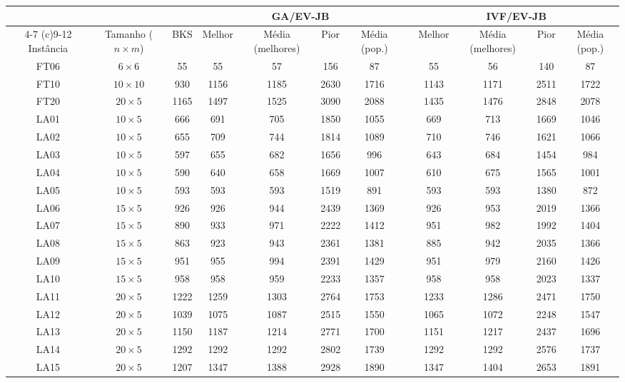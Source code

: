 \begin{sidewaystable}
\caption{Resultados do caso de experimento 4}
\centering
\label{experimento4}
\begin{tabular}{cccccccccccc}
\toprule
& & & \multicolumn{4}{c}{GA/EV-JB} & & \multicolumn{4}{c}{IVF/EV-JB} \\
\cmidrule(c){4-7}
\cmidrule(c){9-12}
Inst\^{a}ncia & Tamanho ($n \times m$) & BKS & Melhor & M\'{e}dia (melhores) & Pior & M\'{e}dia (pop.) & & Melhor & M\'{e}dia (melhores) & Pior & M\'{e}dia (pop.) \\
\midrule
FT06 & $6 \times 6$ & 55 & 55 & 57 & 156 & 87 & & 55 & 56 & 140 & 87 \\
FT10 & $10 \times 10$ & 930 & 1156 & 1185 & 2630 & 1716 & & 1143 & 1171 & 2511 & 1722 \\
FT20 & $20 \times 5$ & 1165 & 1497 & 1525 & 3090 & 2088 & & 1435 & 1476 & 2848 & 2078 \\
LA01 & $10 \times 5$ & 666 & 691 & 705 & 1850 & 1055 & & 669 & 713 & 1669 & 1046 \\
LA02 & $10 \times 5$ & 655 & 709 & 744 & 1814 & 1089 & & 710 & 746 & 1621 & 1066 \\
LA03 & $10 \times 5$ & 597 & 655 & 682 & 1656 & 996 & & 643 & 684 & 1454 & 984 \\
LA04 & $10 \times 5$ & 590 & 640 & 658 & 1669 & 1007 & & 610 & 675 & 1565 & 1001 \\
LA05 & $10 \times 5$ & 593 & 593 & 593 & 1519 & 891 & & 593 & 593 & 1380 & 872 \\
LA06 & $15 \times 5$ & 926 & 926 & 944 & 2439 & 1369 & & 926 & 953 & 2019 & 1366 \\
LA07 & $15 \times 5$ & 890 & 933 & 971 & 2222 & 1412 & & 951 & 982 & 1992 & 1404 \\
LA08 & $15 \times 5$ & 863 & 923 & 943 & 2361 & 1381 & & 885 & 942 & 2035 & 1366 \\
LA09 & $15 \times 5$ & 951 & 955 & 994 & 2391 & 1429 & & 951 & 979 & 2160 & 1426 \\
LA10 & $15 \times 5$ & 958 & 958 & 959 & 2233 & 1357 & & 958 & 958 & 2023 & 1337 \\
LA11 & $20 \times 5$ & 1222 & 1259 & 1303 & 2764 & 1753 & & 1233 & 1286 & 2471 & 1750 \\
LA12 & $20 \times 5$ & 1039 & 1075 & 1087 & 2515 & 1550 & & 1065 & 1072 & 2248 & 1547 \\
LA13 & $20 \times 5$ & 1150 & 1187 & 1214 & 2771 & 1700 & & 1151 & 1217 & 2437 & 1696 \\
LA14 & $20 \times 5$ & 1292 & 1292 & 1292 & 2802 & 1739 & & 1292 & 1292 & 2576 & 1737 \\
LA15 & $20 \times 5$ & 1207 & 1347 & 1388 & 2928 & 1890 & & 1347 & 1404 & 2653 & 1891 \\
\bottomrule
\end{tabular}
\end{sidewaystable}
